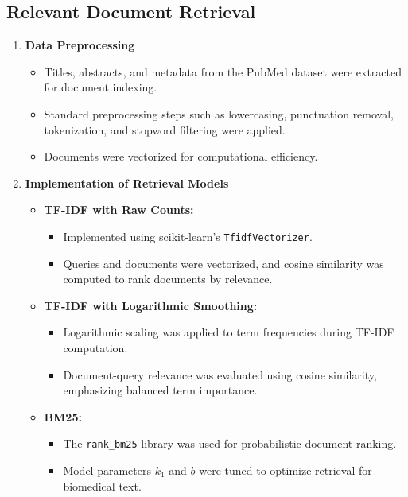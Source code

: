 \documentclass{article}
\begin{document}
\subsection{Relevant Document Retrieval}
\begin{enumerate}
    \item \textbf{Data Preprocessing}
        \begin{itemize}
            \item Titles, abstracts, and metadata from the PubMed dataset were extracted for document indexing.
            \item Standard preprocessing steps such as lowercasing, punctuation removal, tokenization, and stopword filtering were applied.
            \item Documents were vectorized for computational efficiency.
        \end{itemize}
    \item \textbf{Implementation of Retrieval Models}
    \begin{itemize}
        \item \textbf{TF-IDF with Raw Counts:}
        \begin{itemize}
            \item Implemented using scikit-learn’s \texttt{TfidfVectorizer}.
            \item Queries and documents were vectorized, and cosine similarity was computed to rank documents by relevance.
        \end{itemize}
        \item \textbf{TF-IDF with Logarithmic Smoothing:}
        \begin{itemize}
            \item Logarithmic scaling was applied to term frequencies during TF-IDF computation.
            \item Document-query relevance was evaluated using cosine similarity, emphasizing balanced term importance.
        \end{itemize}
        \item \textbf{BM25:}
        \begin{itemize}
            \item The \texttt{rank\_bm25} library was used for probabilistic document ranking.
            \item Model parameters $k_1$ and $b$ were tuned to optimize retrieval for biomedical text.
        \end{itemize}
    \end{itemize}
\end{enumerate}
\end{document}
